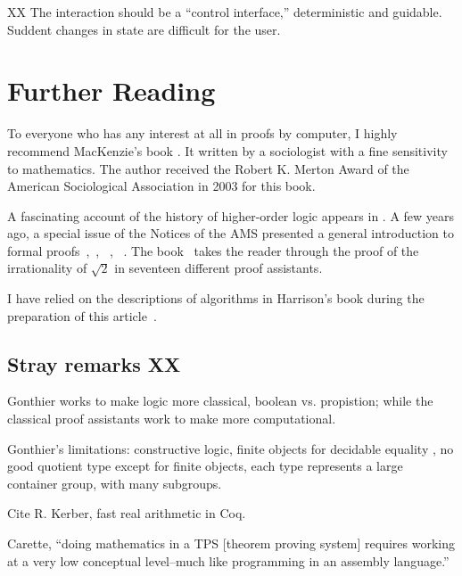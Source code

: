 \documentclass{llncs}
\begin{document}
XX The interaction should be a ``control interface,'' deterministic and guidable.
Suddent changes in state are difficult for the user.



\section{Further Reading}

To everyone who has any interest at all in proofs by computer, I
highly recommend MacKenzie's book \cite{Mac}.  It written by a
sociologist with a fine sensitivity to mathematics.  The author
received the Robert K. Merton Award of the American Sociological
Association in 2003 for this book.

A fascinating account of the history of higher-order logic appears in
\cite{Gor}.  A few years ago, a special issue of the Notices of the
AMS presented a general introduction to formal
proofs~\cite{Hales:2008:formal},~\cite{Harrison:2008:formal},
~\cite{gonthier:2008:formal}, ~\cite{Wiedijk:2008:formal}.  The
book~\cite{wiedijk:17} takes the reader through the proof of the
irrationality of $\sqrt2$ in seventeen different proof assistants.

I have relied on the descriptions of algorithms in
Harrison's book during the preparation of this article~\cite{Ha09}.


\subsection{Stray remarks XX}

Gonthier works to make logic more classical, boolean vs. propistion;
while the classical proof assistants work to make more computational.

Gonthier's limitations: constructive logic, finite objects for
decidable equality , no good quotient type except for finite objects,
each type represents a large container group, with many subgroups.

Cite R. Kerber, fast real arithmetic in Coq.

Carette, ``doing mathematics in a TPS [theorem proving system]
requires working at a very low
conceptual level--much like programming in an assembly language.''

\end{document}
